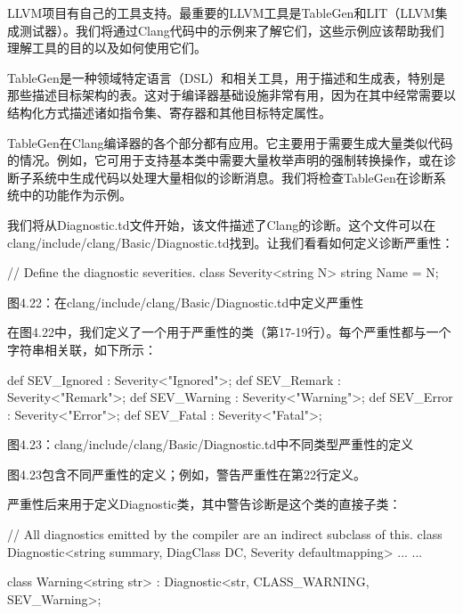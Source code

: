 LLVM项目有自己的工具支持。最重要的LLVM工具是TableGen和LIT（LLVM集成测试器）。我们将通过Clang代码中的示例来了解它们，这些示例应该帮助我们理解工具的目的以及如何使用它们。


TableGen是一种领域特定语言（DSL）和相关工具，用于描述和生成表，特别是那些描述目标架构的表。这对于编译器基础设施非常有用，因为在其中经常需要以结构化方式描述诸如指令集、寄存器和其他目标特定属性。

TableGen在Clang编译器的各个部分都有应用。它主要用于需要生成大量类似代码的情况。例如，它可用于支持基本类中需要大量枚举声明的强制转换操作，或在诊断子系统中生成代码以处理大量相似的诊断消息。我们将检查TableGen在诊断系统中的功能作为示例。

我们将从Diagnostic.td文件开始，该文件描述了Clang的诊断。这个文件可以在clang/include/clang/Basic/Diagnostic.td找到。让我们看看如何定义诊断严重性：

\begin{shell}
// Define the diagnostic severities.
class Severity<string N> {
  string Name = N;
}
\end{shell}

\begin{center}
图4.22：在clang/include/clang/Basic/Diagnostic.td中定义严重性
\end{center}

在图4.22中，我们定义了一个用于严重性的类（第17-19行）。每个严重性都与一个字符串相关联，如下所示：

\begin{shell}
def SEV_Ignored : Severity<"Ignored">;
def SEV_Remark  : Severity<"Remark">;
def SEV_Warning : Severity<"Warning">;
def SEV_Error   : Severity<"Error">;
def SEV_Fatal   : Severity<"Fatal">;
\end{shell}

\begin{center}
图4.23：clang/include/clang/Basic/Diagnostic.td中不同类型严重性的定义
\end{center}

图4.23包含不同严重性的定义；例如，警告严重性在第22行定义。

严重性后来用于定义Diagnostic类，其中警告诊断是这个类的直接子类：

\begin{shell}
// All diagnostics emitted by the compiler are an indirect subclass of this.
class Diagnostic<string summary, DiagClass DC, Severity defaultmapping> {
    ...
}
...

class Warning<string str>   : Diagnostic<str, CLASS_WARNING, SEV_Warning>;
\end{shell}

